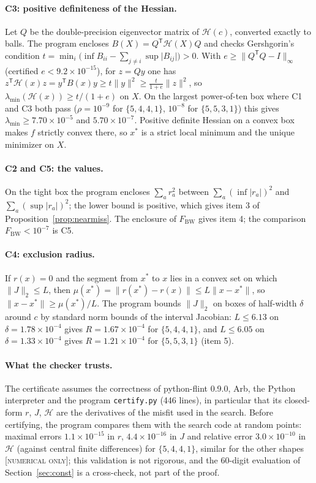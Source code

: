 \documentclass[11pt]{article}
\newcommand{\abs}[1]{\lvert #1\rvert}
\newcommand{\norm}[1]{\lVert #1\rVert}
\newcommand{\st}[1]{\textsc{[#1]}}
\newcommand{\stnum}{\st{numerical only}}
\theoremstyle{definition}
\theoremstyle{remark}
\begin{document}
\paragraph{C3: positive definiteness of the Hessian.} Let $Q$ be the double-precision eigenvector matrix of $\mathcal H(c)$, converted exactly to balls. The program encloses $B(X)=Q^{\mathsf T}\mathcal H(X)Q$ and checks Gershgorin's condition $t=\min_i\bigl(\inf B_{ii}-\sum_{j\ne i}\sup\abs{B_{ij}}\bigr)>0$. With $e\ge\norm{Q^{\mathsf T}Q-I}_\infty$ (certified $e<9.2\times10^{-15}$), for $z=Qy$ one has $z^{\mathsf T}\mathcal H(x)z=y^{\mathsf T}B(x)y\ge t\norm y^2\ge \frac{t}{1+e}\norm z^2$, so $\lambda_{\min}(\mathcal H(x))\ge t/(1+e)$ on $X$. On the largest power-of-ten box where C1 and C3 both pass ($\rho=10^{-9}$ for $\{5,4,4,1\}$, $10^{-8}$ for $\{5,5,3,1\}$) this gives $\lambda_{\min}\ge7.70\times10^{-5}$ and $5.70\times10^{-7}$. Positive definite Hessian on a convex box makes $f$ strictly convex there, so $x^\ast$ is a strict local minimum and the unique minimizer on $X$.

\paragraph{C2 and C5: the values.} On the tight box the program encloses $\sum_a r_a^2$ between $\sum_a(\inf\abs{r_a})^2$ and $\sum_a(\sup\abs{r_a})^2$; the lower bound is positive, which gives item 3 of Proposition~\ref{prop:nearmiss}. The enclosure of $F_{\mathrm{BW}}$ gives item 4; the comparison $F_{\mathrm{BW}}<10^{-7}$ is C5.

\paragraph{C4: exclusion radius.} If $r(x)=0$ and the segment from $x^\ast$ to $x$ lies in a convex set on which $\norm{J}_2\le L$, then $\mu(x^\ast)=\norm{r(x^\ast)-r(x)}\le L\norm{x-x^\ast}$, so $\norm{x-x^\ast}\ge\mu(x^\ast)/L$. The program bounds $\norm J_2$ on boxes of half-width $\delta$ around $c$ by standard norm bounds of the interval Jacobian: $L\le6.13$ on $\delta=1.78\times10^{-4}$ gives $R=1.67\times10^{-4}$ for $\{5,4,4,1\}$, and $L\le6.05$ on $\delta=1.33\times10^{-4}$ gives $R=1.21\times10^{-4}$ for $\{5,5,3,1\}$ (item 5).

\paragraph{What the checker trusts.} The certificate assumes the correctness of python-flint 0.9.0, Arb, the Python interpreter and the program \texttt{certify.py} (446 lines), in particular that its closed-form $r$, $J$, $\mathcal H$ are the derivatives of the misfit used in the search.
Before certifying, the program compares them with the search code at random points: maximal errors $1.1\times10^{-15}$ in $r$, $4.4\times10^{-16}$ in $J$ and relative error $3.0\times10^{-10}$ in $\mathcal H$ (against central finite differences) for $\{5,4,4,1\}$, similar for the other shapes \stnum; this validation is not rigorous, and the 60-digit evaluation of Section~\ref{sec:const} is a cross-check, not part of the proof.
\end{document}
